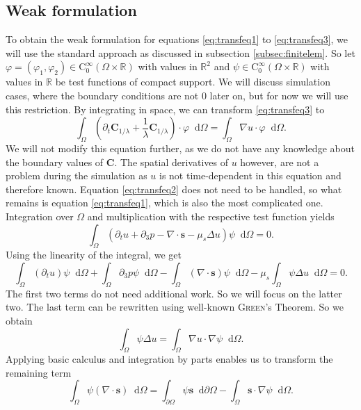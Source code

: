 \documentclass[12pt,a4paper,twoside, open=right]{scrreprt}
\theoremstyle{definition}
\theoremstyle{plain}
\newcommand{\rr}{\mathbb{R}}
\newcommand{\bfs}{\bm{s}}
\newcommand{\bfC}{\bm{C}}
\newcommand{\D}{\mathop{}\!\mathrm{d}}
\begin{document}
\subsection{Weak formulation}
To obtain the weak formulation for equations \eqref{eq:transfeq1} to \eqref{eq:transfeq3}, we will use the standard approach as discussed in subsection \ref{subsec:finitelem}. So let $\varphi = (\varphi_1,\varphi_2)\in \mathrm{C}^\infty_0(\Omega\times\rr)$ with values in $\rr^2$ and $\psi\in \mathrm{C}^\infty_0(\Omega\times\rr)$ with values in $\rr$ be test functions of compact support. We will discuss simulation cases, where the boundary conditions are not 0 later on, but for now we will use this restriction. By integrating in space, we can transform \eqref{eq:transfeq3} to 
\begin{equation}
    \int_\Omega(\partial_t\bfC_{1/\lambda}+\frac{1}{\lambda}\bfC_{1/\lambda})\cdot\varphi\D\Omega = 
   \int_\Omega \nabla u\cdot \varphi\D\Omega.
\end{equation}
We will not modify this equation further, as we do not have any knowledge about the boundary values of $\bfC$. The spatial derivatives of $u$ however, are not a problem during the simulation as $u$ is not time-dependent in this equation and therefore known. Equation \eqref{eq:transfeq2} does not need to be handled, so what remains is equation \eqref{eq:transfeq1}, which is also the most complicated one. Integration over $\Omega$ and multiplication with the respective test function yields
\begin{equation}
    \int_\Omega(\partial_t u + \partial_3 p -\nabla\cdot \bfs -\mu_s\Delta u)\psi\D\Omega = 0.
\end{equation}
Using the linearity of the integral, we get
\begin{equation}
    \int_\Omega(\partial_t u)\psi\D\Omega +\int_\Omega\partial_3 p\psi\D\Omega -\int_\Omega(\nabla\cdot \bfs)\psi\D\Omega -\mu_s\int_\Omega\psi\Delta u\D\Omega=0.
\end{equation}
The first two terms do not need additional work. So we will focus on the latter two. The last term can be rewritten using well-known \textsc{Green}'s Theorem. So we obtain
\begin{equation}
    \int_\Omega \psi\Delta u = \int_\Omega\nabla u\cdot \nabla\psi\D\Omega.
\end{equation}
Applying basic calculus and integration by parts enables us to transform the remaining term
\begin{equation}
    \int_\Omega \psi(\nabla\cdot\bfs)\D\Omega =\int_{\partial\Omega}\psi\bfs\D\partial\Omega -\int_\Omega\bfs\cdot\nabla\psi\D\Omega.
\end{equation}
\end{document}
